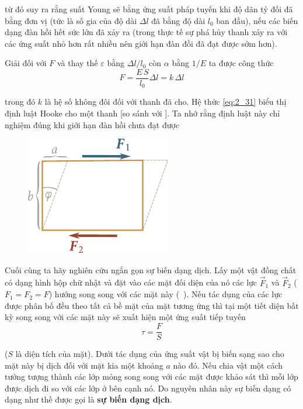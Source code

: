 \noindent
từ đó suy ra rằng suất Young sẽ bằng ứng suất pháp tuyến khi độ dãn tỷ đối đã bằng đơn vị (tức là số gia của độ dài $\Delta l$ đã bằng độ dài $l_0$ ban đầu), nếu các biến dạng đàn hồi hết sức lớn đã xảy ra (trong thực tế sự phá hủy thanh xảy ra với các ứng suất nhỏ hơn rất nhiều nên giới hạn đàn đồi đã đạt được sớm hơn).

Giải  đối với $F$ và thay thế $\varepsilon$ bằng $\Delta l/l_0$ còn $\alpha$ bằng $1/E$ ta được công thức
\begin{equation}\label{eq:2_31}
F = \frac{E\,S}{l_0}\Delta l = k\,\Delta l
\end{equation}

\noindent
trong đó $k$ là hệ số không đôi đối với thanh đã cho. Hệ thức \eqref{eq:2_31} biểu thị định luật Hooke cho một thanh [so sánh với ]. Ta nhớ rằng định luật này chỉ nghiệm đúng khi giới hạn đàn hồi chưa đạt được

\begin{figure}[!htb]
	\begin{center}
		\includegraphics[scale=1]{figures/ch_02/fig_2_7.pdf}
		\caption[]{}
		\label{fig:2_7}
	\end{center}
\end{figure}

Cuối cùng ta hãy nghiên cứu ngắn gọn sự biến dạng dịch. Lấy một vật đồng chất có dạng hình hộp chữ nhật và đặt vào các mặt đối diện của nó các lực $\vec{F}_1$ và $\vec{F}_2$ ($F_1=F_2=F$) hướng song song với các mặt này (~). Nếu tác dụng của các lực được phân bố đều theo tất cả bề mặt của mặt tương ứng thì tại một tiết diện bất kỳ song song với các mặt này sẽ xuất hiện một ứng suất tiếp tuyến
\begin{equation}\label{eq:2_32}
\tau = \frac{F}{S}
\end{equation}

\noindent
($S$ là diện tích của mặt). Dưới tác dụng của ứng suất vật bị biến sạng sao cho mặt này bị dịch đối với mặt kia một khoảng $a$ nào đó. Nếu chia vật một cách tưởng tượng thành các lớp mỏng song song với các mặt được khảo sát thì mỗi lớp được dịch đi so với các lớp ở bên cạnh nó. Do nguyên nhân này sự biến dạng có dạng như thế được gọi là \textbf{sự biến dạng dịch}.


